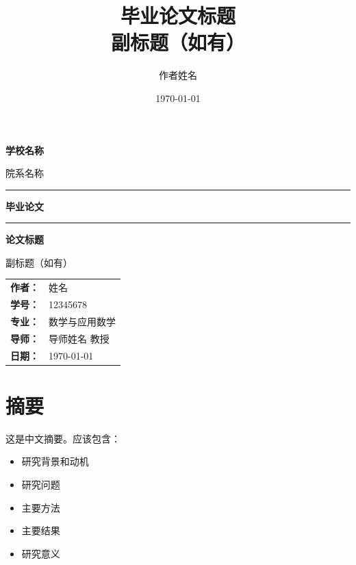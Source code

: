\documentclass[12pt,a4paper]{report}
\title{\Huge\textbf{毕业论文标题}\\[1em]
\Large 副标题（如有）}
\author{作者姓名}
\date{\today}
\theoremstyle{definition}
\begin{document}
\begin{titlepage}
    \centering
    \vspace*{2cm}

    {\Huge\bfseries 学校名称}

    \vspace{1cm}

    {\LARGE 院系名称}

    \vspace{2cm}

    \rule{\textwidth}{1pt}

    \vspace{0.5cm}

    {\Huge\bfseries 毕业论文}

    \vspace{0.5cm}

    \rule{\textwidth}{1pt}

    \vspace{2cm}

    {\LARGE\bfseries 论文标题}

    \vspace{0.5cm}

    {\Large 副标题（如有）}

    \vspace{3cm}

    \begin{tabular}{rl}
        \textbf{作者：} & 姓名 \\[0.5em]
        \textbf{学号：} & 12345678 \\[0.5em]
        \textbf{专业：} & 数学与应用数学 \\[0.5em]
        \textbf{导师：} & 导师姓名 教授 \\[0.5em]
        \textbf{日期：} & \today
    \end{tabular}

    \vfill
\end{titlepage}

\chapter*{摘要}

这是中文摘要。应该包含：
\begin{itemize}
    \item 研究背景和动机
    \item 研究问题
    \item 主要方法
    \item 主要结果
    \item 研究意义
\end{itemize}
\end{document}
